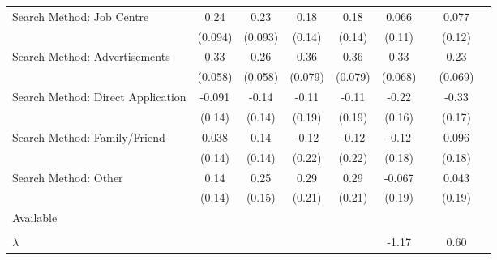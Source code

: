 {\begin{tabular}{l*{8}{c}}
Search Method: Job Centre&    0.24\sym{***}&    0.23\sym{**} &    0.18         &    0.18         &   0.066         &                 &   0.077         &                 \\
               & (0.094)         & (0.093)         &  (0.14)         &  (0.14)         &  (0.11)         &                 &  (0.12)         &                 \\
Search Method: Advertisements&    0.33\sym{***}&    0.26\sym{***}&    0.36\sym{***}&    0.36\sym{***}&    0.33\sym{***}&                 &    0.23\sym{***}&                 \\
               & (0.058)         & (0.058)         & (0.079)         & (0.079)         & (0.068)         &                 & (0.069)         &                 \\
Search Method: Direct Application&  -0.091         &   -0.14         &   -0.11         &   -0.11         &   -0.22         &                 &   -0.33\sym{**} &                 \\
               &  (0.14)         &  (0.14)         &  (0.19)         &  (0.19)         &  (0.16)         &                 &  (0.17)         &                 \\
Search Method: Family/Friend&   0.038         &    0.14         &   -0.12         &   -0.12         &   -0.12         &                 &   0.096         &                 \\
               &  (0.14)         &  (0.14)         &  (0.22)         &  (0.22)         &  (0.18)         &                 &  (0.18)         &                 \\
Search Method: Other&    0.14         &    0.25         &    0.29         &    0.29         &  -0.067         &                 &   0.043         &                 \\
               &  (0.14)         &  (0.15)         &  (0.21)         &  (0.21)         &  (0.19)         &                 &  (0.19)         &                 \\
Available      &                 &                 &                 &                 &                 &                 &                 &                 \\
               &                 &                 &                 &                 &                 &                 &                 &                 \\
$\lambda$      &                 &                 &                 &                 &   -1.17\sym{*}  &                 &    0.60         &                 \\

\end{tabular}}
